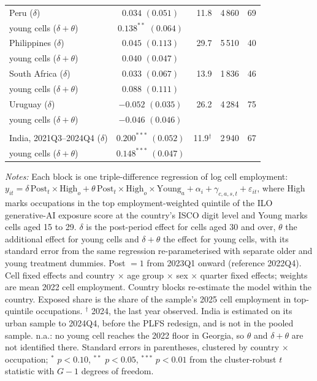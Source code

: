 \begin{table}[htbp]
\begin{threeparttable}
\begin{tabular}{lcrrr}
Peru ($\delta$) & $0.034$ $(0.051)$ & 11.8 & 4\,860 & 69 \\
\quad young cells ($\delta + \theta$) & $0.138^{**}$ $(0.064)$ &  &  &  \\
Philippines ($\delta$) & $0.045$ $(0.113)$ & 29.7 & 5\,510 & 40 \\
\quad young cells ($\delta + \theta$) & $0.040$ $(0.047)$ &  &  &  \\
South Africa ($\delta$) & $0.033$ $(0.067)$ & 13.9 & 1\,836 & 46 \\
\quad young cells ($\delta + \theta$) & $0.088$ $(0.111)$ &  &  &  \\
Uruguay ($\delta$) & $-0.052$ $(0.035)$ & 26.2 & 4\,284 & 75 \\
\quad young cells ($\delta + \theta$) & $-0.046$ $(0.046)$ &  &  &  \\
\addlinespace
\multicolumn{5}{@{}l}{\textit{Annex}} \\
India, 2021Q3--2024Q4 ($\delta$) & $0.200^{***}$ $(0.052)$ & 11.9$^{\dagger}$ & 2\,940 & 67 \\
\quad young cells ($\delta + \theta$) & $0.148^{***}$ $(0.047)$ &  &  &  \\
\bottomrule
\end{tabular}
\begin{tablenotes}[flushleft]
\footnotesize
\item \textit{Notes:} Each block is one triple-difference regression of log cell employment: $y_{it} = \delta\,\text{Post}_t \times \text{High}_{o} + \theta\,\text{Post}_t \times \text{High}_{o} \times \text{Young}_{a} + \alpha_i + \gamma_{c,a,s,t} + \varepsilon_{it}$, where High marks occupations in the top employment-weighted quintile of the ILO generative-AI exposure score at the country's ISCO digit level and Young marks cells aged 15 to 29. $\delta$ is the post-period effect for cells aged 30 and over, $\theta$ the additional effect for young cells and $\delta + \theta$ the effect for young cells, with its standard error from the same regression re-parameterised with separate older and young treatment dummies. Post $=1$ from 2023Q1 onward (reference 2022Q4). Cell fixed effects and country $\times$ age group $\times$ sex $\times$ quarter fixed effects; weights are mean 2022 cell employment. Country blocks re-estimate the model within the country. Exposed share is the share of the sample's 2025 cell employment in top-quintile occupations. $^{\dagger}$ 2024, the last year observed. India is estimated on its urban sample to 2024Q4, before the PLFS redesign, and is not in the pooled sample. n.a.: no young cell reaches the 2022 floor in Georgia, so $\theta$ and $\delta + \theta$ are not identified there. Standard errors in parentheses, clustered by country $\times$ occupation; $^{*}$ $p<0.10$, $^{**}$ $p<0.05$, $^{***}$ $p<0.01$ from the cluster-robust $t$ statistic with $G-1$ degrees of freedom.
\end{tablenotes}
\end{threeparttable}
\end{table}

